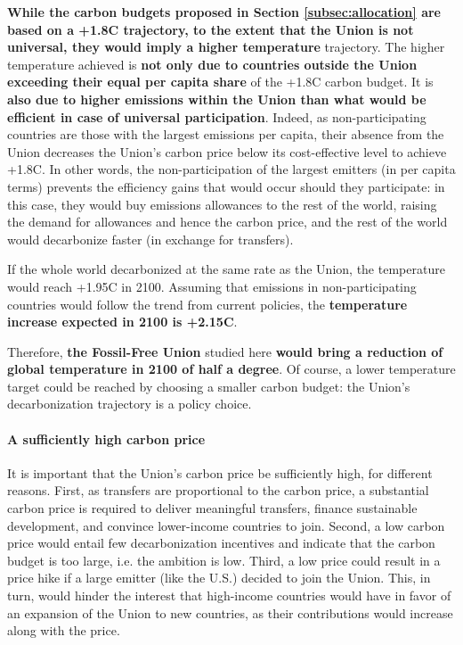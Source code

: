 \documentclass[12pt,english]{article}
\begin{document}
\textbf{While the carbon budgets proposed in Section \ref{subsec:allocation} are based on a +1.8\textdegree{}C trajectory, to the extent that the Union is not universal, they would imply a higher temperature} trajectory. The higher temperature achieved is \textbf{not only due to countries outside the Union exceeding their equal per capita share} of the +1.8\textdegree{}C carbon budget. It is \textbf{also due to higher emissions within the Union than what would be efficient in case of universal participation}. Indeed, as non-participating countries are those with the largest emissions per capita, their absence from the Union decreases the Union's carbon price below its cost-effective level to achieve +1.8\textdegree{}C. In other words, the non-participation of the largest emitters (in per capita terms) prevents the efficiency gains that would occur should they participate: in this case, they would buy emissions allowances to the rest of the world, raising the demand for allowances and hence the carbon price, and the rest of the world would decarbonize faster (in exchange for transfers). 

If the whole world decarbonized at the same rate as the Union, the temperature would reach +1.95\textdegree{}C in 2100. Assuming that emissions in non-participating countries would follow the trend from current policies, the \textbf{temperature increase expected in 2100 is +2.15\textdegree{}C}. 

Therefore, \textbf{the Fossil-Free Union} studied here \textbf{would bring a reduction of global temperature in 2100 of half a degree}. Of course, a lower temperature target could be reached by choosing a smaller carbon budget: the Union's decarbonization trajectory is a policy choice. %

\paragraph{A sufficiently high carbon price}
It is important that the Union's carbon price be sufficiently high, for different reasons. First, as transfers are proportional to the carbon price, a substantial carbon price is required to deliver meaningful transfers, finance sustainable development, and convince lower-income countries to join. Second, a low carbon price would entail few decarbonization incentives and indicate that the carbon budget is too large, i.e. the ambition is low. Third, a low price could result in a price hike if a large emitter (like the U.S.) decided to join the Union. This, in turn, would hinder the interest that high-income countries would have in favor of an expansion of the Union to new countries, as their contributions would increase along with the price.
\end{document}
